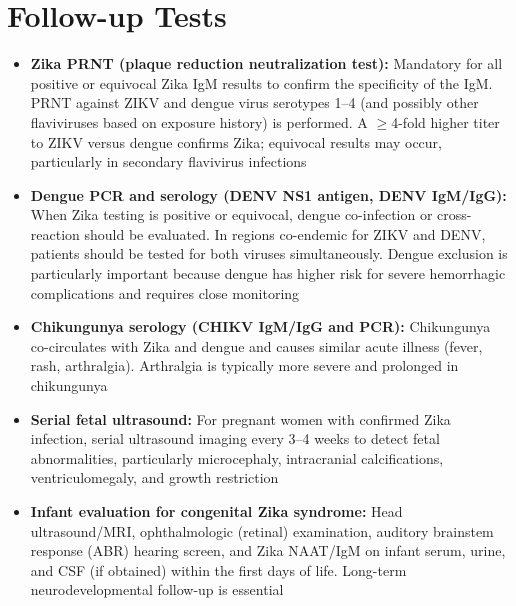 \section*{Follow-up Tests}
\begin{itemize}
  \item \textbf{Zika PRNT (plaque reduction neutralization test):} Mandatory for all positive or equivocal Zika IgM results to confirm the specificity of the IgM. PRNT against ZIKV and dengue virus serotypes 1--4 (and possibly other flaviviruses based on exposure history) is performed. A $\geq$4-fold higher titer to ZIKV versus dengue confirms Zika; equivocal results may occur, particularly in secondary flavivirus infections
  \item \textbf{Dengue PCR and serology (DENV NS1 antigen, DENV IgM/IgG):} When Zika testing is positive or equivocal, dengue co-infection or cross-reaction should be evaluated. In regions co-endemic for ZIKV and DENV, patients should be tested for both viruses simultaneously. Dengue exclusion is particularly important because dengue has higher risk for severe hemorrhagic complications and requires close monitoring
  \item \textbf{Chikungunya serology (CHIKV IgM/IgG and PCR):} Chikungunya co-circulates with Zika and dengue and causes similar acute illness (fever, rash, arthralgia). Arthralgia is typically more severe and prolonged in chikungunya
  \item \textbf{Serial fetal ultrasound:} For pregnant women with confirmed Zika infection, serial ultrasound imaging every 3--4 weeks to detect fetal abnormalities, particularly microcephaly, intracranial calcifications, ventriculomegaly, and growth restriction
  \item \textbf{Infant evaluation for congenital Zika syndrome:} Head ultrasound/MRI, ophthalmologic (retinal) examination, auditory brainstem response (ABR) hearing screen, and Zika NAAT/IgM on infant serum, urine, and CSF (if obtained) within the first days of life. Long-term neurodevelopmental follow-up is essential
\end{itemize}

